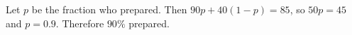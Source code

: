 Let $p$ be the fraction who prepared. Then $90p+40(1-p)=85$, so $50p=45$ and $p=0.9$. Therefore $\boxed{90\%}$ prepared.

